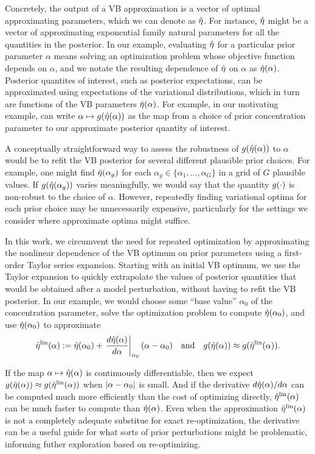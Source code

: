 Concretely, the output of a VB approximation is a vector of optimal
approximating parameters, which we can denote as $\hat\eta$.  For instance,
$\hat\eta$ might be a vector of approximating exponential family natural
parameters for all the quantities in the posterior.  In our example, evaluating
$\hat\eta$ for a particular prior parameter $\alpha$ means solving an
optimization problem whose objective function depends on $\alpha$, and we notate
the resulting dependence of $\hat\eta$ on $\alpha$ as $\hat\eta(\alpha)$.
%
Posterior quantites of interest, such as posterior expectations, can be
approximated using expectations of the variational distributions, which in turn
are functions of the VB parameters $\hat\eta(\alpha)$. For example, in our
motivating example, can write $\alpha \mapsto g(\hat\eta(\alpha))$ as the map
from a choice of prior concentration parameter to our approximate posterior
quantity of interest.

A conceptually straightforward way to assess the robustness of
$g(\hat\eta(\alpha))$ to $\alpha$ would be to refit the VB posterior for several
different plausible prior choices.  For example, one might find
$\hat\eta(\alpha_g)$ for each $\alpha_g \in \{\alpha_1, \ldots, \alpha_G \}$ in a
grid of $G$ plausible values.  If $g(\hat\eta(\alpha_g))$ varies meaningfully,
we would say that the quantity $g(\cdot)$ is non-robust to the choice of
$\alpha$.  However, repeatedly finding variational optima for each prior choice
may be unnecessarily expensive, particularly for the settings we consider where
approximate optima might suffice.

In this work, we circumvent the need for repeated optimization by approximating
the nonlinear dependence of the VB optimum on prior parameters using a
first-order Taylor series expansion.  Starting with an initial VB optimum, we
use the Taylor expansion to quickly extrapolate the values of posterior
quantities that would be obtained after a model perturbation, without having to
refit the VB posterior.  In our example, we would choose some ``base value''
$\alpha_0$ of the concentration parameter, solve the optimization problem to
compute $\hat\eta(\alpha_0)$, and use $\hat\eta(\alpha_0)$ to approximate
%
\begin{align*}
%
\etalin(\alpha) :=
    \etaopt(\alpha_0) +
    \fracat{d\etaopt(\alpha)}{d\alpha}{\alpha_0} (\alpha - \alpha_0)
\mathand
g(\etaopt(\alpha)) \approx g(\etalin(\alpha)).
%
\end{align*}

If the map $\alpha \mapsto \hat\eta(\alpha)$ is continuously differentiable, then
we expect $g(\hat\eta(\alpha)) \approx g(\hat\eta^{\mathrm{lin}}(\alpha))$ when $\left|\alpha -
\alpha_0\right|$ is small.  And if the derivative $d\hat\eta(\alpha) / d\alpha$ can be
computed much more efficiently than the cost of optimizing directly,
$\hat\eta^{\mathrm{lin}}(\alpha)$ can be much faster to compute than $\hat\eta(\alpha)$.  Even
when the approximation $\hat\eta^{\mathrm{lin}}(\alpha)$ is not a completely adequate substitue
for exact re-optimization, the derivative can be a useful guide for what sorts
of prior perturbations might be problematic, informing futher exploration based
on re-optimizing.

